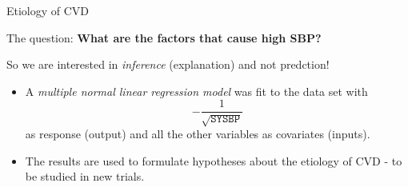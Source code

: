 \documentclass[10pt,ignorenonframetext,]{beamer}
\begin{document}
\begin{frame}

\begin{block}{Etiology of CVD}

\vspace{2mm}

The question: \textbf{What are the factors that cause high SBP?}

\vspace{2mm}

So we are interested in \emph{inference} (explanation) and not
predction!

\vspace{4mm}

\begin{itemize}
\item
  A \emph{multiple normal linear regression model} was fit to the data
  set with \[-\frac{1}{\sqrt{\texttt{SYSBP}}}\] as response (output) and
  all the other variables as covariates (inputs).
\item
  The results are used to formulate hypotheses about the etiology of CVD
  - to be studied in new trials.
\end{itemize}

\end{block}

\end{frame}
\end{document}
